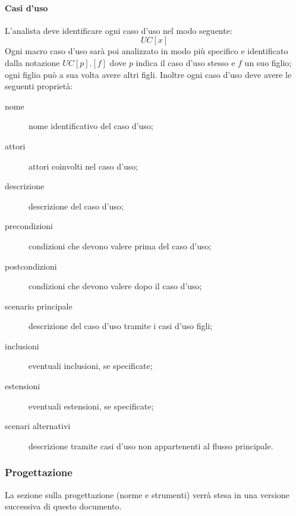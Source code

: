 		\paragraph{Casi d'uso}
		L'analista deve identificare ogni caso d'uso nel modo seguente:
			\[UC[x]\]
		Ogni macro caso d'uso sarà poi analizzato in modo più specifico e identificato dalla notazione $UC[p].[f]$ dove $p$ indica il caso d'uso stesso e $f$ un suo figlio; ogni figlio può a sua volta avere altri figli. Inoltre ogni caso d'uso deve avere le seguenti proprietà:
		\begin{description}
			\item[nome] nome identificativo del caso d'uso;
			\item[attori] attori coinvolti nel caso d'uso;
			\item[descrizione] descrizione del caso d'uso;
			\item[precondizioni] condizioni che devono valere prima del caso d'uso;%
			\item[postcondizioni] condizioni che devono valere dopo il caso d'uso;%
			\item[scenario principale] descrizione del caso d'uso tramite i casi d'uso figli;
			\item[inclusioni] eventuali inclusioni, se specificate;
			\item[estensioni] eventuali estensioni, se specificate;
			\item[scenari alternativi] descrizione tramite casi d'uso non appartenenti al flusso principale.
		\end{description}
	\subsubsection{Progettazione}
	La sezione sulla progettazione (norme e strumenti) verrà stesa in una versione successiva di questo documento.

